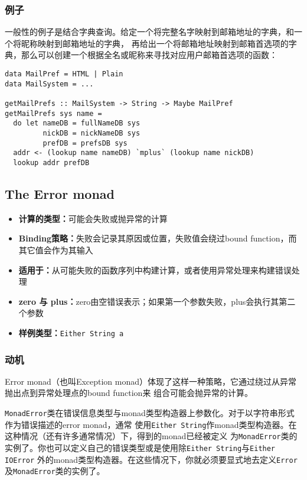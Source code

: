 \subsubsection{例子}
\indent{}一般性的例子是结合字典查询。给定一个将完整名字映射到邮箱地址的字典，和一个将昵称映射到邮箱地址的字典，
再给出一个将邮箱地址映射到邮箱首选项的字典，那么可以创建一个根据全名或昵称来寻找对应用户邮箱首选项的函数：
\begin{verbatim}
data MailPref = HTML | Plain
data MailSystem = ...

getMailPrefs :: MailSystem -> String -> Maybe MailPref
getMailPrefs sys name =
  do let nameDB = fullNameDB sys
         nickDB = nickNameDB sys
         prefDB = prefsDB sys
  addr <- (lookup name nameDB) `mplus` (lookup name nickDB)
  lookup addr prefDB
\end{verbatim}
\clearpage

\subsection{The Error monad}
\begin{itemize}[leftmargin=*,topsep=0pt,itemsep=0pt]
\item \textbf{计算的类型：}可能会失败或抛异常的计算
\item \textbf{Binding策略：}失败会记录其原因或位置，失败值会绕过bound function，而其它值会作为其输入
\item \textbf{适用于：}从可能失败的函数序列中构建计算，或者使用异常处理来构建错误处理
\item \textbf{zero 与 plus：}zero由空错误表示；如果第一个参数失败，plus会执行其第二个参数
\item \textbf{样例类型：}\texttt{Either String a}
\end{itemize}

\subsubsection{动机}
\indent{}Error monad（也叫Exception monad）体现了这样一种策略，它通过绕过从异常抛出点到异常处理点的bound function来
组合可能会抛异常的计算。

\indent{}\texttt{MonadError}类在错误信息类型与monad类型构造器上参数化。对于以字符串形式作为错误描述的error monad，通常
使用\texttt{Either String}作monad类型构造器。在这种情况（还有许多通常情况）下，得到的monad已经被定义
为\texttt{MonadError}类的实例了。你也可以定义自己的错误类型或是使用除\texttt{Either String}与\texttt{Either IOError}
外的monad类型构造器。在这些情况下，你就必须要显式地去定义\texttt{Error}及\texttt{MonadError}类的实例了。

